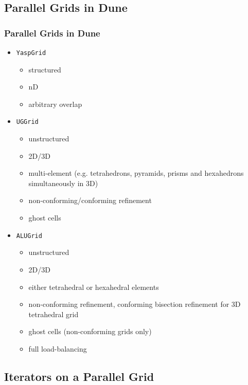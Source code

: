 \documentclass[aspectratio=169,11pt]{beamer}
\theoremstyle{definition}
\begin{document}
\subsection{Parallel Grids in Dune}

\begin{frame}
  \frametitle<presentation>{Parallel Grids in Dune}
  \begin{itemize}
  \item<1-> \lstinline!YaspGrid!
      \begin{itemize}
      \item structured
      \item nD
      \item arbitrary overlap
      \end{itemize}
  \item<2-> \lstinline!UGGrid!
      \begin{itemize}
      \item unstructured
      \item 2D/3D
      \item multi-element (e.g. tetrahedrons, pyramids, prisms and hexahedrons simultaneously in 3D)
      \item non-conforming/conforming refinement
      \item ghost cells
      \end{itemize}
  \item<3-> \lstinline!ALUGrid!
      \begin{itemize}
      \item unstructured
      \item 2D/3D
      \item either tetrahedral or hexahedral elements
      \item non-conforming refinement, conforming bisection refinement for 3D tetrahedral grid
      \item ghost cells (non-conforming grids only)
      \item full load-balancing
      \end{itemize}
  \end{itemize}
\end{frame}

\subsection{Iterators on a Parallel Grid}
\end{document}
